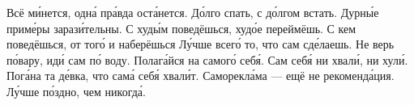 \documentclass[a4paper]{article}
\begin{document}
         {Всё ми́нется, одна́ пра́вда оста́нется.}
         {До́лго спать, с до́лгом встать.}
               {
        Дурны́е приме́ры зарази́тельны.
        \mitem С худы́м поведёшься, худо́е переймёшь.
        \mitem С кем поведёшься, от того́ и наберёшься}
         {
        Лу́чше всего́ то, что сам сде́лаешь.
        \mitem Не верь по́вару, иди́ сам по́ воду.
        \mitem Полага́йся на самого́ себя́.
}
        {Сам себя́ ни хвали́, ни хули́.
        \mitem Пога́на та де́вка, что сама́ себя́ хвали́т.
        \mitem Саморекла́ма --- ещё не рекоменда́ция.}
                {Лу́чше по́здно, чем никогда́.}
\end{document}
